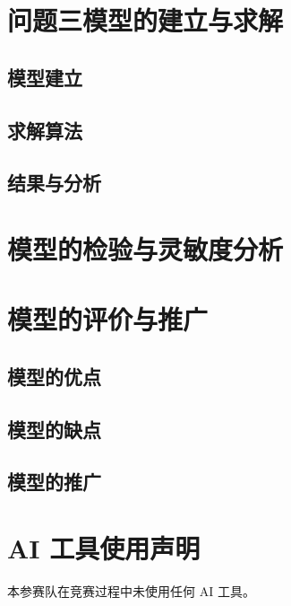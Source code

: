 \documentclass[UTF8,12pt,a4paper,fontset=windows]{ctexart}
\numberwithin{equation}{section}
\begin{document}
\section{问题三模型的建立与求解}
\subsection{模型建立}
\subsection{求解算法}
\subsection{结果与分析}

\section{模型的检验与灵敏度分析}

\section{模型的评价与推广}
\subsection{模型的优点}
\subsection{模型的缺点}
\subsection{模型的推广}

\section*{AI 工具使用声明}

本参赛队在竞赛过程中未使用任何 AI 工具。

\end{document}
